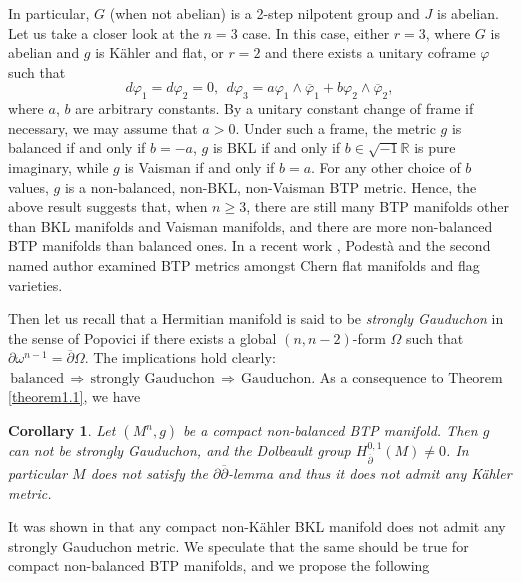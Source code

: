 \documentclass{amsart}
\numberwithin{equation}{section}
\newtheorem{corollary}  [theorem]     {Corollary}
\theoremstyle{definition}
\renewcommand{\1}{\mathds{1}}
\renewcommand{\>}{\rightarrow}
\begin{document}
In particular, $G$  (when not abelian) is a 2-step nilpotent group and $J$ is abelian. Let us take a closer look at the $n=3$ case.
In this case, either $r=3$, where $G$ is abelian and $g$ is K\"ahler and flat, or $r=2$ and there exists a unitary coframe $\varphi$ such that
$$ d\varphi_1=d\varphi_2=0, \ \ d\varphi_3 = a\varphi_1\wedge \overline{\varphi}_1 + b \varphi_2\wedge \overline{\varphi}_2, $$
where $a$, $b$ are arbitrary constants. By a unitary constant change of frame if necessary, we may assume that $a>0$.
Under such a frame, the metric $g$ is balanced if and only if $b=-a$, $g$ is BKL if and only if $b\in \sqrt{-1}{\mathbb R}$ is pure imaginary,
while $g$ is Vaisman if and only if $b=a$. For any other choice of $b$ values, $g$ is a non-balanced, non-BKL, non-Vaisman BTP metric.
Hence, the above result suggests that, when $n\geq 3$, there are still many BTP manifolds other than BKL manifolds and Vaisman manifolds,
and there are more non-balanced BTP manifolds than balanced ones. In a recent work \cite{PodestaZ}, Podest\`a and the second named author examined BTP metrics amongst Chern flat manifolds and flag varieties.






Then let us recall that a Hermitian manifold is said to be {\em strongly Gauduchon} in the sense of Popovici \cite{Pop} if there exists a global $(n,n-2)$-form $\Omega$ such that $\partial \omega^{n-1} = \overline{\partial} \Omega$.
The implications hold clearly: $\, \mbox{balanced} \,  \Longrightarrow \,  \mbox{strongly\ Gauduchon}  \, \Longrightarrow  \, \mbox{Gauduchon}$. As a consequence to Theorem \ref{theorem1.1}, we have


\begin{corollary} \label{cor1.11}
Let $(M^n,g)$ be a compact non-balanced BTP manifold. Then $g$ can not be strongly Gauduchon, and the Dolbeault group $H^{0,1}_{\overline{\partial}}(M) \neq 0$.
In particular $M$ does not satisfy the $\partial \overline{\partial}$-lemma and thus it does not admit any K\"ahler metric.
\end{corollary}

It was shown in \cite[Theorem 4]{ZhaoZ19Str} that any compact non-K\"ahler BKL manifold does not admit any strongly Gauduchon metric. We speculate that the same should be true for compact non-balanced BTP manifolds, and we propose the following
\end{document}
